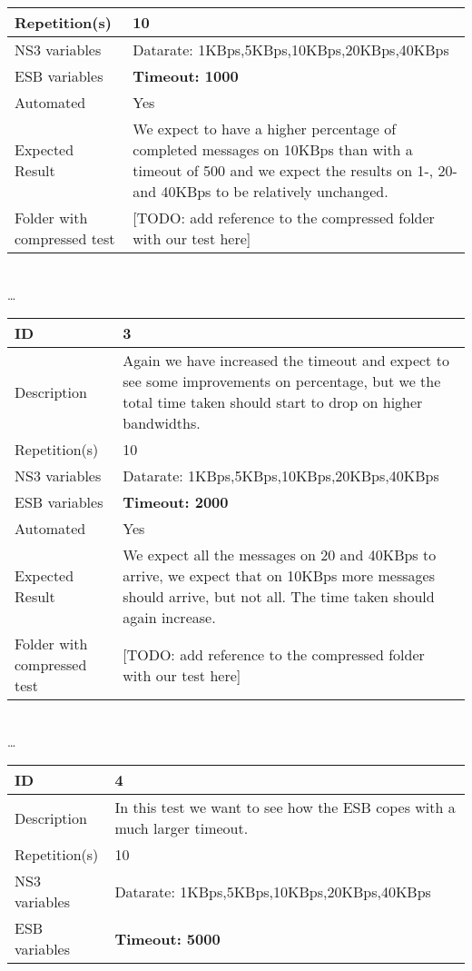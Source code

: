 \begin{center}
\begin{tabular}{| p{4cm} | p{8cm} |}
\hline
Repetition(s) & 10 \\
\hline
NS3 variables & Datarate: 1KBps,5KBps,10KBps,20KBps,40KBps \\
\hline
ESB variables & \textbf{Timeout: 1000} \\
\hline
Automated & Yes \\
\hline
Expected Result & We expect to have a higher percentage of completed messages on 10KBps than with a timeout of 500 and we expect the results on 1-, 20- and 40KBps to be relatively unchanged. \\
\hline
Folder with compressed test & [TODO: add reference to the compressed folder with our test here]\\
\hline
\end{tabular}
\\ \ldots \\
\begin{tabular}{| p{4cm} | p{8cm} |}%
\hline
ID & 3 \\
\hline
Description & Again we have increased the timeout and expect to see some improvements on percentage, but we the total time taken should start to drop on higher bandwidths.  \\
\hline
Repetition(s) & 10 \\
\hline
NS3 variables & Datarate: 1KBps,5KBps,10KBps,20KBps,40KBps \\
\hline
ESB variables & \textbf{Timeout: 2000} \\
\hline
Automated & Yes \\
\hline
Expected Result & We expect all the messages on 20 and 40KBps to arrive, we expect that on 10KBps more messages should arrive, but not all. The time taken should again increase. \\
\hline
Folder with compressed test & [TODO: add reference to the compressed folder with our test here]\\
\hline
\end{tabular}
\\ \ldots \\
\begin{tabular}{| p{4cm} | p{8cm} |}%
\hline
ID & 4 \\
\hline
Description & In this test we want to see how the ESB copes with a much larger timeout.  \\
\hline
Repetition(s) & 10 \\
\hline
NS3 variables & Datarate: 1KBps,5KBps,10KBps,20KBps,40KBps \\
\hline
ESB variables & \textbf{Timeout: 5000} \\

\end{tabular}
\end{center}
